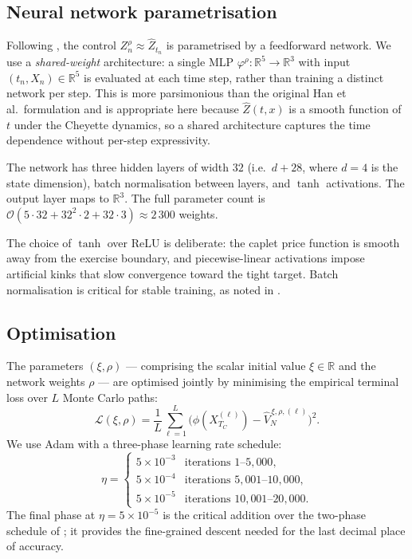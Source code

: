 \documentclass[11pt,a4paper]{article}
\newcommand{\R}{\mathbb{R}}
\begin{document}
\subsection{Neural network parametrisation}

Following \cite{HJE2018}, the control $Z^\rho_n \approx \widehat{Z}_{t_n}$ is
parametrised by a feedforward network. We use a \emph{shared-weight} architecture:
a single MLP $\varphi^\rho: \R^5 \to \R^3$ with input $(t_n, X_n) \in \R^5$
is evaluated at each time step, rather than training a distinct network per step.
This is more parsimonious than the original Han et al.\ formulation and is
appropriate here because $\widehat{Z}(t, x)$ is a smooth function of $t$ under
the Cheyette dynamics, so a shared architecture captures the time dependence
without per-step expressivity.

The network has three hidden layers of width $32$ (i.e.\ $d + 28$, where
$d = 4$ is the state dimension), batch normalisation between layers, and
$\tanh$ activations. The output layer maps to $\R^3$. The full parameter
count is $\mathcal{O}(5 \cdot 32 + 32^2 \cdot 2 + 32 \cdot 3) \approx 2\,300$
weights.

The choice of $\tanh$ over ReLU is deliberate: the caplet price function is
smooth away from the exercise boundary, and piecewise-linear activations
impose artificial kinks that slow convergence toward the tight target.
Batch normalisation is critical for stable training, as noted in \cite{HJE2018}.

\subsection{Optimisation}

The parameters $(\xi, \rho)$ — comprising the scalar initial value $\xi \in \R$
and the network weights $\rho$ — are optimised jointly by minimising the
empirical terminal loss over $L$ Monte Carlo paths:
\begin{equation}
  \mathcal{L}(\xi, \rho) = \frac{1}{L}\sum_{\ell=1}^{L}
    \bigl(\phi(X^{(\ell)}_{T_C}) - \widehat{V}^{\,\xi,\rho,(\ell)}_{N}\bigr)^2.
  \label{eq:loss}
\end{equation}
We use Adam with a three-phase learning rate schedule:
\begin{equation}
  \eta =
  \begin{cases}
    5 \times 10^{-3} & \text{iterations } 1\text{--}5{,}000, \\
    5 \times 10^{-4} & \text{iterations } 5{,}001\text{--}10{,}000, \\
    5 \times 10^{-5} & \text{iterations } 10{,}001\text{--}20{,}000.
  \end{cases}
  \label{eq:lr}
\end{equation}
The final phase at $\eta = 5 \times 10^{-5}$ is the critical addition over
the two-phase schedule of \cite{HJE2018}; it provides the fine-grained descent
needed for the last decimal place of accuracy.
\end{document}
